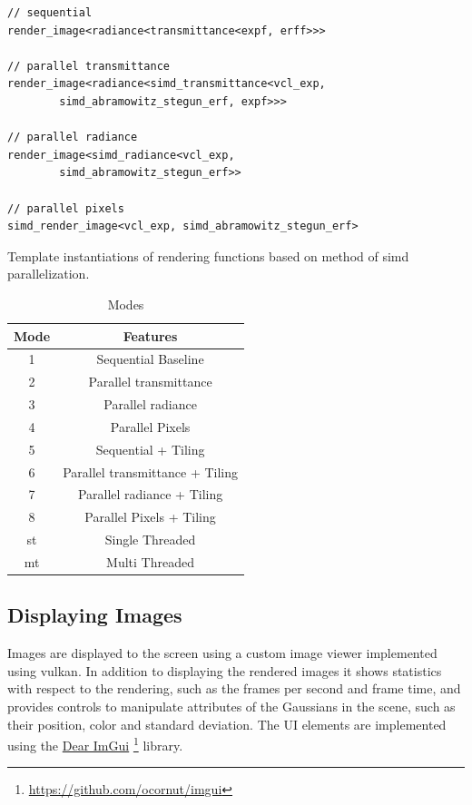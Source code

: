 \documentclass[a4paper, 11pt]{memoir}
\begin{document}
    \begin{listing}[t]
        \begin{verbatim}
// sequential
render_image<radiance<transmittance<expf, erff>>>

// parallel transmittance
render_image<radiance<simd_transmittance<vcl_exp,
        simd_abramowitz_stegun_erf, expf>>>

// parallel radiance
render_image<simd_radiance<vcl_exp,
        simd_abramowitz_stegun_erf>>

// parallel pixels
simd_render_image<vcl_exp, simd_abramowitz_stegun_erf>
        \end{verbatim}
        \caption{Template instantiations of rendering functions based on method of \gls{simd} parallelization.}
        \label{lst:template_inst}
    \end{listing}

    \begin{table}[b]
        \centering
        \begin{tabular}{|c|c|}
            \hline
            Mode & Features\\\hline
            1    & Sequential Baseline\\
            2    & Parallel \gls{transmittance}\\
            3    & Parallel \gls{radiance}\\
            4    & Parallel Pixels\\
            5    & Sequential + Tiling\\
            6    & Parallel \gls{transmittance} + Tiling\\
            7    & Parallel \gls{radiance} + Tiling\\
            8    & Parallel Pixels + Tiling\\
            st   & Single Threaded\\
            mt   & Multi Threaded\\
            \hline
        \end{tabular}
        \caption{Modes}
        \label{tab:exec_modes}
    \end{table}

    \subsection{Displaying Images}
    \label{sec:displaying_images}

    Images are displayed to the screen using a custom image viewer implemented using \gls{vulkan}. In addition to displaying
    the rendered images it shows statistics with respect to the rendering, such as the frames per second and frame time,
    and provides controls to manipulate attributes of the Gaussians in the scene, such as their position, color and standard
    deviation.
    The UI elements are implemented using the \href{https://github.com/ocornut/imgui}{Dear ImGui}
    \footnote{\href{https://github.com/ocornut/imgui}{https://github.com/ocornut/imgui}} library.
    
\end{document}
